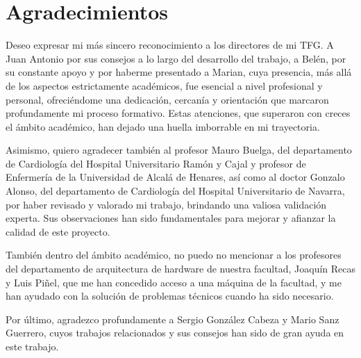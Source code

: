 
\chapter*{Agradecimientos}

Deseo expresar mi más sincero reconocimiento a los directores de mi TFG. A Juan Antonio por sus consejos a lo largo del desarrollo del trabajo, a Belén, por su constante apoyo y por haberme presentado a Marian, cuya presencia, más allá de los aspectos estrictamente académicos, fue esencial a nivel profesional y personal, ofreciéndome una dedicación, cercanía y orientación que marcaron profundamente mi proceso formativo. Estas atenciones, que superaron con creces el ámbito académico, han dejado una huella imborrable en mi trayectoria.

Asimismo, quiero agradecer también al profesor Mauro Buelga, del departamento de Cardiología del Hospital Universitario Ramón y Cajal y profesor de Enfermería de la Universidad de Alcalá de Henares, así como al doctor Gonzalo Alonso, del departamento de Cardiología del Hospital Universitario de Navarra, por haber revisado y valorado mi trabajo, brindando una valiosa validación experta. Sus observaciones han sido fundamentales para mejorar y afianzar la calidad de este proyecto.

También dentro del ámbito académico, no puedo no mencionar a los profesores del departamento de arquitectura de hardware de nuestra facultad, Joaquín Recas y Luis Piñel, que me han concedido acceso a una máquina de la facultad, y me han ayudado con la solución de problemas técnicos cuando ha sido necesario.

Por último, agradezco profundamente a Sergio González Cabeza y Mario Sanz Guerrero, cuyos trabajos relacionados y sus consejos han sido de gran ayuda en este trabajo.




